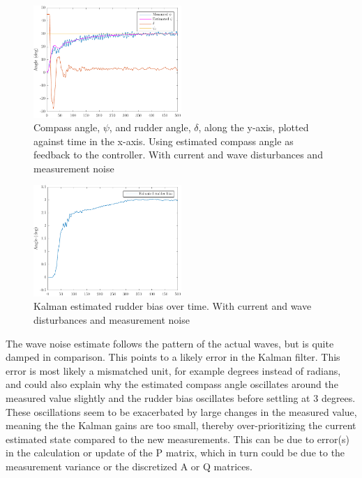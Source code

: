\begin{figure}[htp]
    \centering
    \includegraphics[width=0.5\textwidth]{images/5e-psi_and_rudder}
    \caption{Compass angle, $\psi$, and rudder angle, $\delta$, along the y-axis, plotted against time in the x-axis. Using estimated compass angle as feedback to the controller. With current and wave disturbances and measurement noise}
    \label{fig:5e-psi_and_rudder}
\end{figure}

\begin{figure}[htp]
    \centering
    \includegraphics[width=0.5\textwidth]{images/5e-estimated_rudder_bias}
    \caption{Kalman estimated rudder bias over time. With current and wave disturbances and measurement noise}
    \label{fig:5e-estimated_rudder_bias}
\end{figure}

The wave noise estimate follows the pattern of the actual waves, but is quite damped in comparison.  This points to a likely error in the Kalman filter. This error is most likely a mismatched unit, for example degrees instead of radians, and could also explain why the estimated compass angle oscillates around the measured value slightly and the rudder bias oscillates before settling at 3 degrees.  These oscillations seem to be exacerbated by large changes in the measured value, meaning the the Kalman gains are too small, thereby over-prioritizing the current estimated state compared to the new measurements. This can be due to error(s) in the calculation or update of the P matrix, which in turn could be due to the measurement variance or the discretized A or Q matrices.

